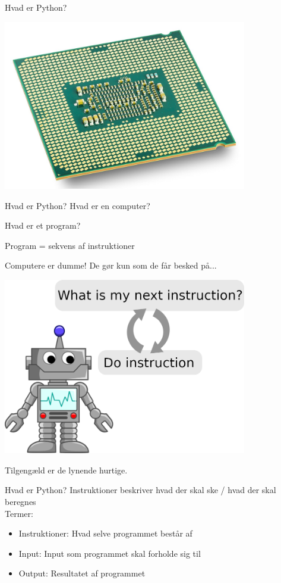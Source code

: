 \documentclass[10pt]{beamer}
\begin{document}
\begin{frame}{Hvad er Python?}
  \begin{center}
    \includegraphics[width=0.8\textwidth]{cpu.jpg}
  \end{center}
\end{frame}

\begin{frame}{Hvad er Python?}
  Hvad er en computer?
  \pause

  Hvad er et program?
  \pause
  
  Program = sekvens af instruktioner

  Computere er dumme! De gør kun som de får besked på...

  \begin{center}
    \includegraphics[width=0.8\textwidth]{cpu-cartoon.png}
  \end{center}

  \pause
  Tilgengæld er de lynende hurtige.
  
\end{frame}

\begin{frame}{Hvad er Python?}
	Instruktioner beskriver hvad der skal ske / hvad der skal beregnes\\
	Termer:
	\begin{itemize}
		\item Instruktioner: Hvad selve programmet består af
		\item Input: Input som programmet skal forholde sig til
		\item Output: Resultatet af programmet
	\end{itemize}    
    
\end{frame}
\end{document}
